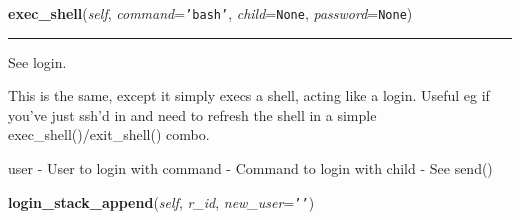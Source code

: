     \vspace{0.5ex}

\hspace{.8\funcindent}\begin{boxedminipage}{\funcwidth}

    \raggedright \textbf{exec\_shell}(\textit{self}, \textit{command}={\tt \texttt{'}\texttt{bash}\texttt{'}}, \textit{child}={\tt None}, \textit{password}={\tt None})

    \vspace{-1.5ex}

    \rule{\textwidth}{0.5\fboxrule}
\setlength{\parskip}{2ex}
    See login.

    This is the same, except it simply execs a shell, acting like a login. 
    Useful eg if you've just ssh'd in and need to refresh the shell in a 
    simple exec\_shell()/exit\_shell() combo.

    user     - User to login with command  - Command to login with child
    - See send()

\setlength{\parskip}{1ex}
    \end{boxedminipage}

    \label{shutit_global:ShutIt:login_stack_append}

    \vspace{0.5ex}

\hspace{.8\funcindent}\begin{boxedminipage}{\funcwidth}

    \raggedright \textbf{login\_stack\_append}(\textit{self}, \textit{r\_id}, \textit{new\_user}={\tt \texttt{'}\texttt{}\texttt{'}})

\setlength{\parskip}{2ex}
\setlength{\parskip}{1ex}
    \end{boxedminipage}

    \label{shutit_global:ShutIt:login}

    \vspace{0.5ex}

